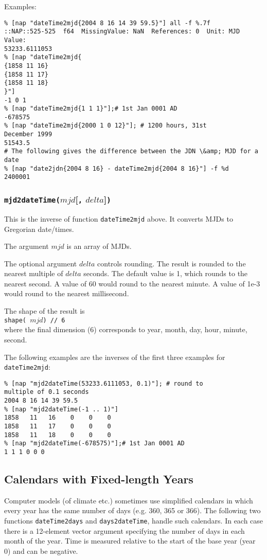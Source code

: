 Examples:
      \begin{verbatim}
% [nap "dateTime2mjd{2004 8 16 14 39 59.5}"] all -f %.7f
::NAP::525-525  f64  MissingValue: NaN  References: 0  Unit: MJD
Value:
53233.6111053
% [nap "dateTime2mjd{
{1858 11 16}
{1858 11 17}
{1858 11 18}
}"]
-1 0 1
% [nap "dateTime2mjd{1 1 1}"];# 1st Jan 0001 AD
-678575
% [nap "dateTime2mjd{2000 1 0 12}"]; # 1200 hours, 31st
December 1999
51543.5
# The following gives the difference between the JDN \&amp; MJD for a
date
% [nap "date2jdn{2004 8 16} - dateTime2mjd{2004 8 16}"] -f %d
2400001
\end{verbatim}

      \subsubsection{
        \label{mjd2dateTime} \texttt{mjd2dateTime(}$mjd$[\texttt{,} $delta$]\texttt{)}
      }
This is the inverse of function 
      \texttt{dateTime2mjd} above. It converts MJDs to Gregorian
      date/times.
      

The argument 
      $mjd$ is an array of MJDs.
      

The optional argument 
      $delta$ controls rounding. The result is rounded to the
      nearest multiple of 
      $delta$ seconds. The default value is 1, which rounds to
      the nearest second. A value of 60 would round to the nearest
      minute. A value of 1e-3 would round to the nearest
      millisecond.
      

The shape of the result is
      \\
      \texttt{shape( 
      $mjd$) // 6}
      \\where the final dimension (6) corresponds to year, month,
      day, hour, minute, second.
      

The following examples are the inverses of the first three
      examples for 
      \texttt{dateTime2mjd}:
      \begin{verbatim}
% [nap "mjd2dateTime(53233.6111053, 0.1)"]; # round to
multiple of 0.1 seconds
2004 8 16 14 39 59.5
% [nap "mjd2dateTime(-1 .. 1)"]
1858   11   16    0    0    0
1858   11   17    0    0    0
1858   11   18    0    0    0
% [nap "mjd2dateTime(-678575)"];# 1st Jan 0001 AD
1 1 1 0 0 0
\end{verbatim}

      \subsection{
        \label{fixed-years}Calendars with Fixed-length Years
      }
Computer models (of climate etc.) sometimes use simplified
      calendars in which every year has the same number of days (e.g.
      360, 365 or 366). The following two functions 
      \texttt{dateTime2days} and 
      \texttt{days2dateTime}, handle such calendars. In each case
      there is a 12-element vector argument specifying the number of
      days in each month of the year. Time is measured relative to the
      start of the base year (year 0) and can be negative.
